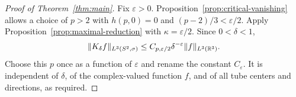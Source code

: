 \begin{proof}[Proof of Theorem~\ref{thm:main}]
Fix \(\varepsilon>0\).  Proposition~\ref{prop:critical-vanishing}
allows a choice of \(p>2\) with \(h(p,0)=0\) and
\((p-2)/3<\varepsilon/2\).  Apply
Proposition~\ref{prop:maximal-reduction} with
\(\kappa=\varepsilon/2\).  Since \(0<\delta<1\),
\[
  \|K_\delta f\|_{L^3(S^2,\sigma)}
     \le C_{p,\varepsilon/2}
               \delta^{-\varepsilon}\|f\|_{L^3(\mathbb R^3)}.
\]
Choose this \(p\) once as a function of \(\varepsilon\) and rename
the constant \(C_\varepsilon\).  It is independent of \(\delta\),
of the complex-valued function \(f\), and of all tube centers and
directions, as required.
\end{proof}

